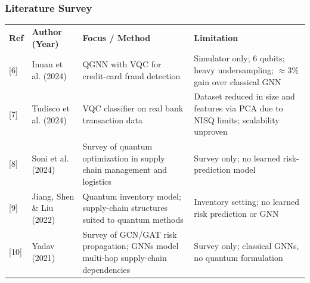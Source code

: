 \documentclass{beamer}
\newcommand{\tabfont}{\scriptsize}
\newcommand{\rowgap}{\addlinespace[4pt]}
\begin{document}
\begin{frame}[t,shrink=12]
\frametitle{Literature Survey}
\tabfont
\centering
\begin{tabularx}{\linewidth}{@{}>{\raggedright\arraybackslash}p{0.6cm}
                               >{\raggedright\arraybackslash}p{2.2cm}
                               >{\raggedright\arraybackslash}X
                               >{\raggedright\arraybackslash}X@{}}
\multicolumn{4}{@{}c@{}}{\textbf{Table 1: Literature Survey (Contd.)}} \\
\toprule
\textbf{Ref} & \textbf{Author (Year)} & \textbf{Focus / Method} & \textbf{Limitation} \\
\midrule
{[6]} & Innan et al. (2024) &
QGNN with VQC for credit-card fraud detection &
Simulator only; 6 qubits; heavy undersampling; $\approx$3\% gain over classical GNN \\ \rowgap

[7] & Tudisco et al. (2024) &
VQC classifier on real bank transaction data &
Dataset reduced in size and features via PCA due to NISQ limits; scalability unproven \\ \rowgap

[8] & Soni et al. (2024) &
Survey of quantum optimization in supply chain management and logistics &
Survey only; no learned risk-prediction model \\ \rowgap

[9] & Jiang, Shen \& Liu (2022) &
Quantum inventory model; supply-chain structures suited to quantum methods &
Inventory setting; no learned risk prediction or GNN \\ \rowgap

[10] & Yadav (2021) &
Survey of GCN/GAT risk propagation; GNNs model multi-hop supply-chain dependencies &
Survey only; classical GNNs, no quantum formulation \\
\bottomrule
\end{tabularx}
\end{frame}
\end{document}

